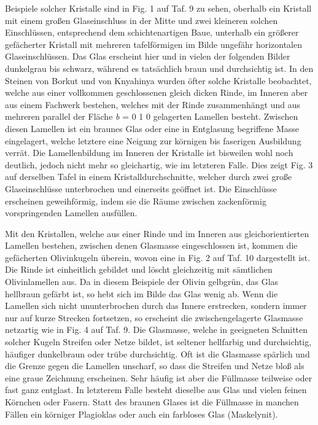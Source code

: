 \documentclass[a4paper, 11pt, oneside, polutonikogreek, german]{article}
\begin{document}
Beispiele solcher Kristalle sind in Fig. 1 auf Taf. 9 zu sehen, oberhalb ein Kristall mit einem großen Glaseinschluss in der Mitte und zwei kleineren solchen Einschlüssen, entsprechend dem schichtenartigen Baue, unterhalb ein größerer gefächerter Kristall mit mehreren tafelförmigen im Bilde ungefähr horizontalen Glaseinschlüssen. Das Glas erscheint hier und in vielen der folgenden Bilder dunkelgrau bis schwarz, während es tatsächlich braun und durchsichtig ist. In den Steinen von Borkut und von Knyahinya wurden öfter solche Kristalle beobachtet, welche aus einer vollkommen geschlossenen gleich dicken Rinde, im Inneren aber aus einem Fachwerk bestehen, welches mit der Rinde zusammenhängt und aus mehreren parallel der Fläche \emph{b} = 0 1 0 gelagerten Lamellen besteht. Zwischen diesen Lamellen ist ein braunes Glas oder eine in Entglasung begriffene Masse eingelagert, welche letztere eine Neigung zur körnigen bis faserigen Ausbildung verrät. Die Lamellenbildung im Inneren der Kristalle ist bisweilen wohl noch deutlich, jedoch nicht mehr so gleichartig, wie im letzteren Falle. Dies zeigt Fig. 3 auf derselben Tafel in einem Kristalldurchschnitte, welcher durch zwei große Glaseinschlüsse unterbrochen und einerseits geöffnet ist. Die Einschlüsse erscheinen geweihförmig, indem sie die Räume zwischen zackenförmig vorspringenden Lamellen ausfüllen.

Mit den Kristallen, welche aus einer Rinde und im Inneren aus gleichorientierten Lamellen bestehen, zwischen denen Glasmasse eingeschlossen ist, kommen die gefächerten Olivinkugeln überein, wovon eine in Fig. 2 auf Taf. 10 dargestellt ist. Die Rinde ist einheitlich gebildet und löscht gleichzeitig mit sämtlichen Olivinlamellen aus. Da in diesem Beispiele der Olivin gelbgrün, das Glas hellbraun gefärbt ist, so hebt sich im Bilde das Glas wenig ab. Wenn die Lamellen sich nicht ununterbrochen durch das Innere erstrecken, sondern immer nur auf kurze Strecken fortsetzen, so erscheint die zwischengelagerte Glasmasse netzartig wie in Fig. 4 auf Taf. 9. Die Glasmasse, welche in geeigneten Schnitten solcher Kugeln Streifen oder Netze bildet, ist seltener hellfarbig und durchsichtig, häufiger dunkelbraun oder trübe durchsichtig. Oft ist die Glasmasse spärlich und die Grenze gegen die Lamellen unscharf, so dass die Streifen und Netze bloß als eine graue Zeichnung erscheinen. Sehr häufig ist aber die Füllmasse teilweise oder fast ganz entglast. In letzterem Falle besteht dieselbe aus Glas und vielen feinen Körnchen oder Fasern. Statt des braunen Glases ist die Füllmasse in manchen Fällen ein körniger Plagioklas oder auch ein farbloses Glas (Maskelynit).
\end{document}
